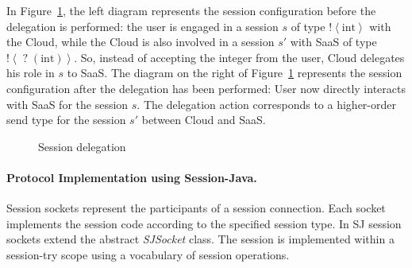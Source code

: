\documentclass[10pt]{llncs}
\begin{document}
In Figure~\ref{fig:sj-delegation}, the left diagram represents the session configuration before the delegation is performed: the user is engaged in a session $s$ of type $\mathopen{!}\left<\text{int}\right>$ with the Cloud, while the Cloud is also involved in a session $s'$ with SaaS of type $\mathopen{!}\left<\mathopen{?}\left(\text{int}\right)\right>$. So, instead of accepting the integer from the user, Cloud delegates his role in $s$ to SaaS.
The diagram on the right of Figure~\ref{fig:sj-delegation} represents the session configuration after the delegation has been performed: User now directly interacts with SaaS for the session $s$.
The delegation action corresponds to a higher-order send type for the session $s'$ between Cloud and SaaS.
%
\begin{figure}[ht]
\centering
{}
\caption{Session delegation}\label{fig:sj-delegation}
\end{figure}

\paragraph{Protocol Implementation using Session-Java.}
Session sockets represent the participants of a session connection.
Each socket implements the session code according to the specified session type.
In SJ session sockets extend the abstract \textit{SJSocket} class. %
The session is implemented within a session-try scope using a vocabulary of session operations. %
\end{document}
